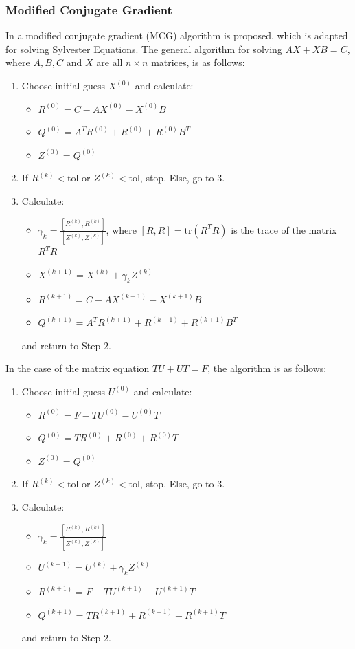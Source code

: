 \documentclass{article}
\numberwithin{equation}{section}
\begin{document}
\subsubsection{Modified Conjugate Gradient}
In \cite{Hou} a modified conjugate gradient (MCG) algorithm is proposed, which is adapted for solving Sylvester Equations. The general algorithm for solving $AX+XB=C$, where $A, B, C$ and $X$ are all $n \times n$ matrices, is as follows:
\begin{enumerate}
\item Choose initial guess $X^{(0)}$ and calculate:
	\begin{itemize}
	\item $R^{(0)} = C - AX^{(0)} - X^{(0)}B$
	\item $Q^{(0)} = A^T R^{(0)} + R^{(0)} + R^{(0)} B^T$
	\item $Z^{(0)} = Q^{(0)}$
	\end{itemize}
\item If $R^{(k)} < \text{tol}$ or $Z^{(k)} < \text{tol}$, stop. Else, go to 3.
\item Calculate:
	\begin{itemize}
	\item $\gamma_k = \frac{[R^{(k)}, R^{(k)}]}{[Z^{(k)}, Z^{(k)}]}$, where $[R,R] = \text{tr}(R^T R)$ is the trace of the matrix $R^T R$
	\item $X^{(k+1)} = X^{(k)} + \gamma_k Z^{(k)}$
	\item $R^{(k+1)} = C - AX^{(k+1)} - X^{(k+1)} B$
	\item $Q^{(k+1)} = A^T R^{(k+1)} + R^{(k+1)} + R^{(k+1)} B^T$
	\end{itemize}
	and return to Step 2.
\end{enumerate}

In the case of the matrix equation $TU+UT=F$, the algorithm is as follows:
\begin{enumerate}
\item Choose initial guess $U^{(0)}$ and calculate:
	\begin{itemize}
	\item $R^{(0)} = F - TU^{(0)} - U^{(0)}T$
	\item $Q^{(0)} = T R^{(0)} + R^{(0)} + R^{(0)} T$
	\item $Z^{(0)} = Q^{(0)}$
	\end{itemize}
\item If $R^{(k)} < \text{tol}$ or $Z^{(k)} < \text{tol}$, stop. Else, go to 3.
\item Calculate:
	\begin{itemize}
	\item $\gamma_k = \frac{[R^{(k)}, R^{(k)}]}{[Z^{(k)}, Z^{(k)}]}$
	\item $U^{(k+1)} = U^{(k)} + \gamma_k Z^{(k)}$
	\item $R^{(k+1)} = F - TU^{(k+1)} - U^{(k+1)} T$
	\item $Q^{(k+1)} = T R^{(k+1)} + R^{(k+1)} + R^{(k+1)} T$
	\end{itemize}
	and return to Step 2.
\end{enumerate}
\end{document}
